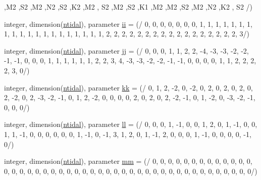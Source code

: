 \begin{DoxyCompactItemize}
\textquotesingle{},\textquotesingle{}M2 \textquotesingle{},\textquotesingle{}S2 \textquotesingle{},\textquotesingle{}M2 \textquotesingle{},\textquotesingle{}N2 \textquotesingle{},\textquotesingle{}S2 \textquotesingle{},\textquotesingle{}K2 \textquotesingle{},\textquotesingle{}M2 \textquotesingle{}, \textquotesingle{}S2 \textquotesingle{},\textquotesingle{}M2 \textquotesingle{},\textquotesingle{}S2 \textquotesingle{},\textquotesingle{}K1 \textquotesingle{},\textquotesingle{}M2 \textquotesingle{},\textquotesingle{}M2 \textquotesingle{},\textquotesingle{}S2 \textquotesingle{},\textquotesingle{}M2 \textquotesingle{},\textquotesingle{}N2 \textquotesingle{},\textquotesingle{}K2 \textquotesingle{}, \textquotesingle{}S2 \textquotesingle{}/)
\item 
integer, dimension(\mbox{\hyperlink{namespacemoduletoga_ae4b0b997b6803ae8647fdd97f2dda666}{ntidal}}), parameter \mbox{\hyperlink{namespacemoduletoga_a0218336e96a9b01a78de8d432ce819a2}{ii}} = (/ 0, 0, 0, 0, 0, 0, 0, 1, 1, 1, 1, 1, 1, 1, 1, 1, 1, 1, 1, 1, 1, 1, 1, 1, 1, 1, 1, 2, 2, 2, 2, 2, 2, 2, 2, 2, 2, 2, 2, 2, 2, 2, 2, 2, 3/)
\item 
integer, dimension(\mbox{\hyperlink{namespacemoduletoga_ae4b0b997b6803ae8647fdd97f2dda666}{ntidal}}), parameter \mbox{\hyperlink{namespacemoduletoga_aa9d388e57890548d613710d426c60d00}{jj}} = (/ 0, 0, 0, 1, 1, 2, 2, -\/4, -\/3, -\/3, -\/2, -\/2, -\/1, -\/1, 0, 0, 0, 1, 1, 1, 1, 1, 1, 2, 2, 3, 4, -\/3, -\/3, -\/2, -\/2, -\/1, -\/1, 0, 0, 0, 0, 1, 1, 2, 2, 2, 2, 3, 0/)
\item 
integer, dimension(\mbox{\hyperlink{namespacemoduletoga_ae4b0b997b6803ae8647fdd97f2dda666}{ntidal}}), parameter \mbox{\hyperlink{namespacemoduletoga_ad26516df51749ac7f2fd2a972f1a6a26}{kk}} = (/ 0, 1, 2, -\/2, 0, -\/2, 0, 2, 0, 2, 0, 2, 0, 2, -\/2, 0, 2, -\/3, -\/2, -\/1, 0, 1, 2, -\/2, 0, 0, 0, 0, 2, 0, 2, 0, 2, -\/2, -\/1, 0, 1, -\/2, 0, -\/3, -\/2, -\/1, 0, 0, 0/)
\item 
integer, dimension(\mbox{\hyperlink{namespacemoduletoga_ae4b0b997b6803ae8647fdd97f2dda666}{ntidal}}), parameter \mbox{\hyperlink{namespacemoduletoga_a2c0e244dff07733f78c917efe2bbbc82}{ll}} = (/ 0, 0, 0, 1, -\/1, 0, 0, 1, 2, 0, 1, -\/1, 0, 0, 1, 1, -\/1, 0, 0, 0, 0, 0, 0, 1, -\/1, 0, -\/1, 3, 1, 2, 0, 1, -\/1, 2, 0, 0, 0, 1, -\/1, 0, 0, 0, 0, -\/1, 0/)
\item 
integer, dimension(\mbox{\hyperlink{namespacemoduletoga_ae4b0b997b6803ae8647fdd97f2dda666}{ntidal}}), parameter \mbox{\hyperlink{namespacemoduletoga_a3bf11793a5868095fc707ec57cb7eff0}{mm}} = (/ 0, 0, 0, 0, 0, 0, 0, 0, 0, 0, 0, 0, 0, 0, 0, 0, 0, 0, 0, 0, 0, 0, 0, 0, 0, 0, 0, 0, 0, 0, 0, 0, 0, 0, 0, 0, 0, 0, 0, 0, 0, 0, 0, 0, 0/)

\end{DoxyCompactItemize}
